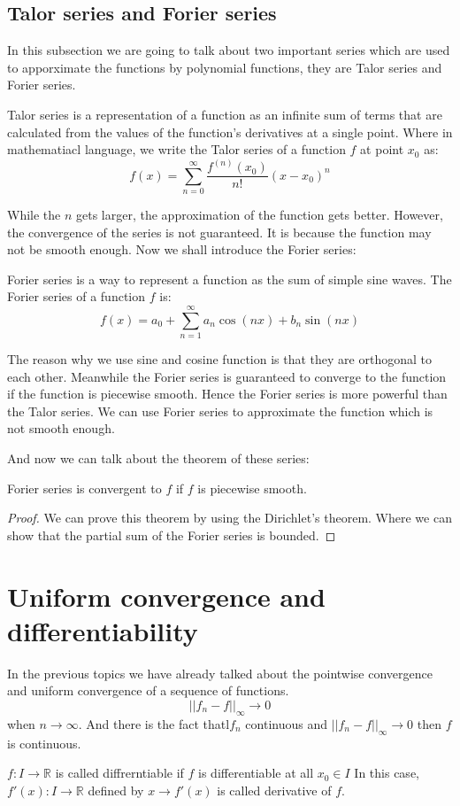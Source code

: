 \documentclass{article}
\newcommand{\R}{\mathbb{R}}
\begin{document}
\subsection{Talor series and Forier series}
In this subsection we are going to talk about two important series which are used to apporximate the functions by polynomial functions,
they are Talor series and Forier series. 
\begin{definition}
Talor series is a representation of a function as an infinite sum of terms that are calculated from the values of the function's derivatives at a single point.
Where in mathematiacl language, we write the Talor series of a function $f$ at point $x_0$ as: 
\begin{equation*}
  f(x)=\sum_{n=0}^\infty \frac{f^{(n)}(x_0)}{n!}(x-x_0)^n
  \end{equation*}
\end{definition}
While the $n$ gets larger, the approximation of the function gets better. However, the convergence of the series is not guaranteed.
It is because the function may not be smooth enough. 
Now we shall introduce the Forier series:
\begin{definition}
  Forier series is a way to represent a function as the sum of simple sine waves. The Forier series of a function $f$ is:
  \begin{equation}
    f(x)=a_0+\sum_{n=1}^\infty a_n\cos(nx)+b_n\sin(nx) 
  \end{equation}
\end{definition}
The reason why we use sine and cosine function is that they are orthogonal to each other.
Meanwhile the Forier series is guaranteed to converge to the function if the function is piecewise smooth.
Hence the Forier series is more powerful than the Talor series.
We can use Forier series to approximate the function which is not smooth enough.

And now we can talk about the theorem of these series:
\begin{theorem}
  Forier series is convergent to $f$ if $f$ is piecewise smooth.
\end{theorem}

\begin{proof}
  We can prove this theorem by using the Dirichlet's theorem.
  Where we can show that the partial sum of the Forier series is bounded.
\end{proof}

\section{Uniform convergence and differentiability}
In the previous topics we have already talked about the pointwise convergence and uniform convergence of a sequence of functions.
$$||f_n-f||_\infty \to 0$$ when $n\to \infty$.
And there is the fact thatl$f_n$ continuous and $||f_n-f||_\infty \to 0$ then $f$ is continuous.
\begin{definition}
 $f:I \to \R$ is called diffrerntiable if $f$ is differentiable at all $x_0\in I$
In this case, $f'(x):I \to \R$ defined by $x \to f'(x)$ is called derivative of $f$.
\end{definition}
\end{document}
